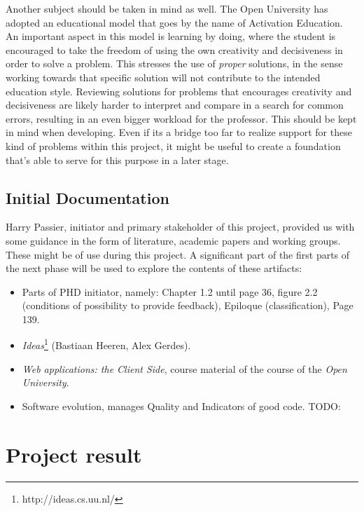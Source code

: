 \documentclass{article}
\begin{document}
Another subject should be taken in mind as well. The Open University has
adopted an educational model that goes by the name of Activation Education. An
important aspect in this model is learning by doing, where the student is
encouraged to take the freedom of using the own creativity and decisiveness in
order to solve a problem. This stresses the use of {\em proper} solutions, in
the sense working towards that specific solution will not contribute to the
intended education style. Reviewing solutions for problems that encourages
creativity and decisiveness are likely harder to interpret and compare in a
search for common errors, resulting in an even bigger workload for the
professor. This should be kept in mind when developing. Even if its a bridge
too far to realize support for these kind of problems within this project, it
might be useful to create a foundation that's able to serve for this purpose in
a later stage.

\subsection{Initial Documentation}

Harry Passier, initiator and primary stakeholder of this project, provided us
with some guidance in the form of literature, academic papers and working
groups. These might be of use during this project. A significant part of the
first parts of the next phase will be used to explore the contents of these
artifacts:
\begin{itemize}
  \item Parts of PHD initiator, namely: Chapter 1.2 until page 36, figure
    2.2 (conditions of possibility to provide feedback), Epiloque
    (classification), Page 139.
  \item {\em Ideas}\footnote{http://ideas.cs.uu.nl/} (Bastiaan Heeren, Alex
    Gerdes).
  \item {\em Web applications: the Client Side}, course material of the course
    of the {\em Open University}.
  \item Software evolution, manages Quality and Indicators of good code. TODO:
\end{itemize}

\section{Project result}
% 
\end{document}

